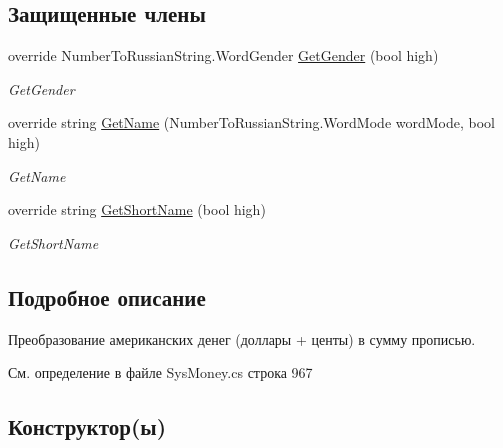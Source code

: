 \subsection*{Защищенные члены}
\begin{DoxyCompactItemize}
\item 
override Number\+To\+Russian\+String.\+Word\+Gender \mbox{\hyperlink{class_f_b_a_1_1_dollar_to_string_provider_a9eb995705420a105f5d0d6b7fb48fc90}{Get\+Gender}} (bool high)
\begin{DoxyCompactList}\small\item\em Get\+Gender \end{DoxyCompactList}\item 
override string \mbox{\hyperlink{class_f_b_a_1_1_dollar_to_string_provider_aa76306e1936425f5c39e70ccdd79ba7a}{Get\+Name}} (Number\+To\+Russian\+String.\+Word\+Mode word\+Mode, bool high)
\begin{DoxyCompactList}\small\item\em Get\+Name \end{DoxyCompactList}\item 
override string \mbox{\hyperlink{class_f_b_a_1_1_dollar_to_string_provider_a3da0b133efc7076214481a3c85819cde}{Get\+Short\+Name}} (bool high)
\begin{DoxyCompactList}\small\item\em Get\+Short\+Name \end{DoxyCompactList}\end{DoxyCompactItemize}


\subsection{Подробное описание}
Преобразование американских денег (доллары + центы) в сумму прописью. 



См. определение в файле Sys\+Money.\+cs строка 967



\subsection{Конструктор(ы)}
\mbox{\label{class_f_b_a_1_1_dollar_to_string_provider_a6e6ba007bbc128dab84b737f637bd726}} 
